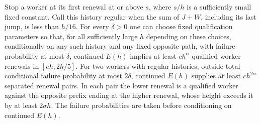\begin{lemma}
\label{lem:10-usable-renewals}
Stop a worker at its first renewal at or above \(s\), where \(s/h\) is
a sufficiently small fixed constant. Call this history regular when
the sum of \(J+W\), including its last jump, is less than \(h/16\).
For every \(\delta>0\) one can choose fixed qualification parameters so
that, for all sufficiently large \(h\) depending on these choices,
conditionally on any such history and any fixed opposite path,
with failure probability at most \(\delta\), continued \(E(h)\) implies
at least \(c h^\alpha\) qualified worker renewals in \([eh,2h/5]\).
For two workers with regular histories, outside total conditional failure
probability at most \(2\delta\), continued \(E(h)\) supplies at least
\(ch^{2\alpha}\) separated renewal pairs. In each pair the lower renewal
is a qualified worker against the opposite prefix ending at the higher
renewal, whose height exceeds it by at least \(2\sigma h\).
The failure probabilities are taken before conditioning on continued
\(E(h)\).
\end{lemma}

